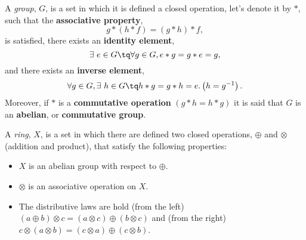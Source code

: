 \begin{defi}[Group]
    A \textit{group}, $G$, is a set in which it is defined a closed operation, let's
    denote it by $*$, such that the \textbf{associative property},
    \begin{equation}
        g * \left( h * f \right) = \left( g * h \right) * f,
    \end{equation}
    is satisfied, there exists an \textbf{identity element},
    \begin{equation}
        \exists\ e\in G\tq \forall g\in G, e * g = g * e = g,
    \end{equation}
    and there exists an \textbf{inverse element},
    \begin{equation}
        \forall g\in G, \exists\ h\in G \tq h * g = g * h = e. \left( h = g^{-1}\right).
    \end{equation}
    Moreover, if $*$ is a \textbf{commutative operation} $\left( g*h = h*g \right)$ it is said that $G$ is
    an \textbf{abelian}, or \textbf{commutative group}.

\end{defi}

\begin{defi}[Ring]
    A \textit{ring}, $X$, is a set in which there are defined two closed operations, $\oplus$
    and $\otimes$ (addition and product), that satisfy the following properties:
    \begin{itemize}[itemsep = -2pt]
        \item $X$ is an abelian group with respect to $\oplus$.
        \item $\otimes$ is an associative operation on $X$.
        \item The distributive laws are hold (from the left) $\left( a\oplus b \right) \otimes c = \left( a\otimes c \right) \oplus \left( b\otimes c \right) $ and (from the right) $c\otimes\left( a\otimes b \right) =
            \left( c\otimes a \right) \oplus \left( c\otimes b \right) $.
    \end{itemize}
\end{defi}


